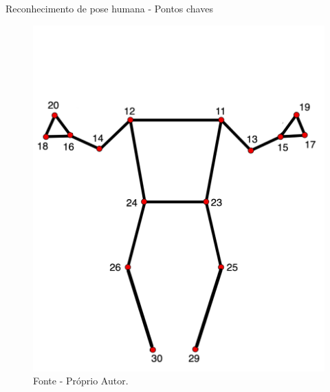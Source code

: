 
\begin{frame}{Reconhecimento de pose humana - Pontos chaves}
    \begin{figure}[!ht]
    \centering
    \includegraphics[scale=0.2]{img/desenvolvimento/eph/pose_landmarks_custom.png}
    \caption*{Fonte - Próprio Autor.}
    \end{figure}
\end{frame}

